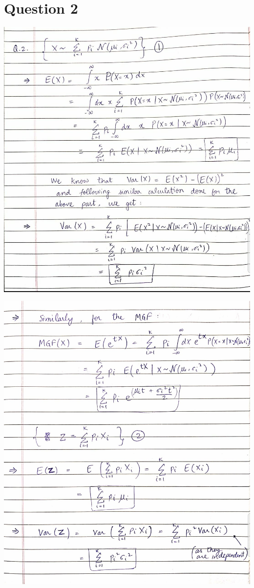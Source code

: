 \documentclass{article}
\theoremstyle{remark}
\begin{document}
\section{Question 2}
\includegraphics[width=\textwidth, height=\textheight, keepaspectratio]{q2-1.jpeg} \par
\includegraphics[width=\textwidth, height=\textheight, keepaspectratio]{q2-2.jpeg} \par
\end{document}

